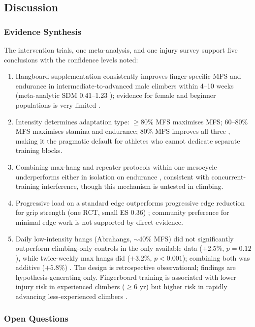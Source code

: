 \subsection{Discussion}

\subsubsection{Evidence Synthesis}

The intervention trials, one meta-analysis, and one injury survey support five conclusions with the confidence levels noted:
\begin{enumerate}[noitemsep, topsep=2pt]
  \item Hangboard supplementation consistently improves finger-specific MFS and endurance in intermediate-to-advanced male climbers within 4--10 weeks (meta-analytic SDM 0.41--1.23 \cite{SO23}); evidence for female and beginner populations is very limited \cite{LAS24}.
  \item Intensity determines adaptation type: $\geq80\%$ MFS maximises MFS; 60--80\% MFS maximises stamina and endurance; 80\% MFS improves all three \cite{DO22}, making it the pragmatic default for athletes who cannot dedicate separate training blocks.
  \item Combining max-hang and repeater protocols within one mesocycle underperforms either in isolation on endurance \cite{O19}, consistent with concurrent-training interference, though this mechanism is untested in climbing.
  \item Progressive load on a standard edge outperforms progressive edge reduction for grip strength (one RCT, small ES 0.36) \cite{MSAE21}; community preference for minimal-edge work is not supported by direct evidence.
  \item Daily low-intensity hangs (Abrahangs, ${\sim}40\%$ MFS) did not significantly outperform climbing-only controls in the only available data ($+2.5\%$, $p = 0.12$), while twice-weekly max hangs did ($+3.2\%$, $p < 0.001$); combining both was additive ($+5.8\%$) \cite{GKAO24}. The design is retrospective observational; findings are hypothesis-generating only. Fingerboard training is associated with lower injury risk in experienced climbers ($\geq6$ yr) but higher risk in rapidly advancing less-experienced climbers \cite{O23}.
\end{enumerate}

\subsubsection{Open Questions}


